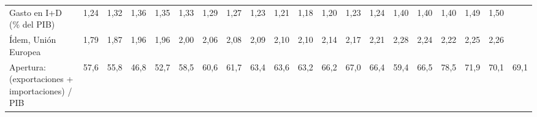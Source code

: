 \begin{tabular}{@{}>{\raggedright\arraybackslash}p{\dimexpr\anchoetq-\tabcolsep\relax}*{19}{N}@{}}
Gasto en I+D (\% del PIB) & 1{,}24 & 1{,}32 & 1{,}36 & 1{,}35 & 1{,}33 & 1{,}29 & 1{,}27 & 1{,}23 & 1{,}21 & 1{,}18 & 1{,}20 & 1{,}23 & 1{,}24 & 1{,}40 & 1{,}40 & 1{,}40 & 1{,}49 & 1{,}50 &  \\
\hspace*{0.8em}Ídem, Unión Europea & 1{,}79 & 1{,}87 & 1{,}96 & 1{,}96 & 2{,}00 & 2{,}06 & 2{,}08 & 2{,}09 & 2{,}10 & 2{,}10 & 2{,}14 & 2{,}17 & 2{,}21 & 2{,}28 & 2{,}24 & 2{,}22 & 2{,}25 & 2{,}26 &  \\
Apertura: (exportaciones + importaciones) / PIB & 57{,}6 & 55{,}8 & 46{,}8 & 52{,}7 & 58{,}5 & 60{,}6 & 61{,}7 & 63{,}4 & 63{,}6 & 63{,}2 & 66{,}2 & 67{,}0 & 66{,}4 & 59{,}4 & 66{,}5 & 78{,}5 & 71{,}9 & 70{,}1 & 69{,}1 \\
\bottomrule
\end{tabular}
